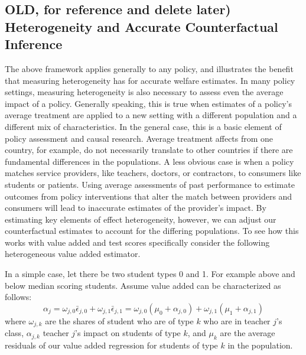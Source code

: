 \documentclass[12pt]{article}
\theoremstyle{definition}
\theoremstyle{definition}
\theoremstyle{definition}
\theoremstyle{definition}
\begin{document}
\pagebreak

   \subsection{OLD, for reference and delete later) Heterogeneity and Accurate Counterfactual Inference}
   \label{va_hetero}
   
   The above framework applies generally to any policy, and illustrates the benefit that measuring heterogeneity has for accurate welfare estimates. In many policy settings, measuring heterogeneity is also necessary to assess even the average impact of a policy. Generally speaking, this is true when estimates of a policy's average treatment are applied to a new setting with a different population and a different mix of characteristics. In the general case, this is a basic element of policy assessment and causal research. Average treatment affects from one country, for example, do not necessarily translate to other countries if there are fundamental differences in the populations. A less obvious case is when a policy matches service providers, like teachers, doctors, or contractors, to consumers like students or patients. Using average assessments of past performance to estimate outcomes from policy interventions that alter the match between providers and consumers will lead to inaccurate estimates of the provider's impact. By estimating key elements of effect heterogeneity, however, we can adjust our counterfactual estimates to account for the differing populations. To see how this works with value added and test scores specifically consider the following heterogeneous value added estimator. 
   
    In a simple case, let there be two student types 0 and 1. For example above and below median scoring students. Assume value added can be characterized as follows:
    \[
    \alpha_j = \omega_{j,0}\bar{\epsilon}_{j,0}  + \omega_{j,1}\bar{\epsilon}_{j,1} =  \omega_{j,0}(\mu_0 +\alpha_{j,0}) + \omega_{j,1}(\mu_1 +\alpha_{j,1})
    \]
    \noindent where $\omega_{j,k}$ are the shares of student who are of type $k$ who are in teacher $j$'s class, $\alpha_{j,k}$ teacher $j$'s  impact on students of type $k$, and $\mu_k$ are the average residuals of our value added regression for students of type $k$ in the population.
    
\end{document}
